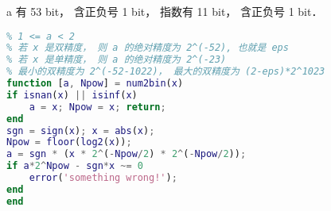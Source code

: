 
a 有 53 bit， 含正负号 1 bit， 指数有 11 bit， 含正负号 1 bit．

\begin{lstlisting}[language=matlab, caption=num2bin.m]
% x = a*2^Npow (精确成立)
% 1 <= a < 2
% 若 x 是双精度， 则 a 的绝对精度为 2^(-52), 也就是 eps
% 若 x 是单精度， 则 a 的绝对精度为 2^(-23)
% 最小的双精度为 2^(-52-1022)， 最大的双精度为 (2-eps)*2^1023
function [a, Npow] = num2bin(x)
if isnan(x) || isinf(x)
    a = x; Npow = x; return;
end
sgn = sign(x); x = abs(x);
Npow = floor(log2(x));
a = sgn * (x * 2^(-Npow/2) * 2^(-Npow/2));
if a*2^Npow - sgn*x ~= 0
    error('something wrong!');
end
end
\end{lstlisting}
